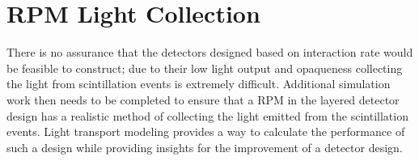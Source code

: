 


\section{RPM Light Collection}
There is no assurance that the detectors designed based on interaction rate would be feasible to construct; due to their low light output and opaqueness collecting the light from scintillation events is extremely difficult.  
Additional simulation work then needs to be completed to ensure that a RPM in the layered detector design has a realistic method of collecting the light emitted from the scintillation events.
Light transport modeling provides a way to calculate the performance of such a design while providing insights for the improvement of a detector design.

